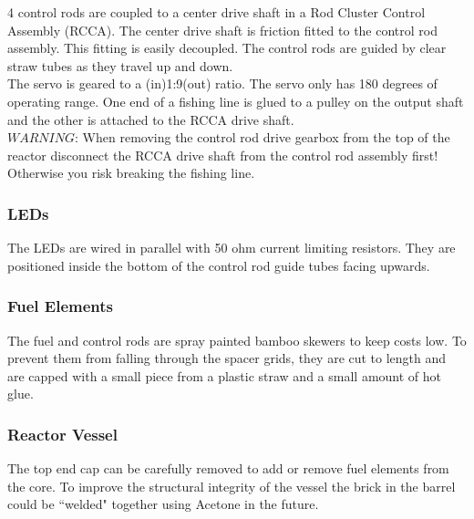 \documentclass[8pt]{article}
\begin{document}
4 control rods are coupled to a center drive shaft in a Rod Cluster Control Assembly (RCCA).  The center drive shaft is friction fitted to the control rod assembly.  This fitting is easily decoupled. The control rods are guided by clear straw tubes as they travel up and down. \\

The servo is geared to a (in)1:9(out) ratio.  The servo only has 180 degrees of operating range.  One end of a fishing line is glued to a pulley on the output shaft and the other is attached to the RCCA drive shaft. \\

$WARNING$:  When removing the control rod drive gearbox from the top of the reactor  disconnect the RCCA drive shaft from the control rod assembly first!  Otherwise you risk breaking the fishing line.

\subsubsection{LEDs}

The LEDs are wired in parallel with 50 ohm current limiting resistors.  They are positioned inside the bottom of the control rod guide tubes facing upwards.

\subsubsection{Fuel Elements}

The fuel and control rods are spray painted bamboo skewers to keep costs low.  To prevent them from falling through the spacer grids, they are cut to length and are capped with a small piece from a plastic straw and a small amount of hot glue.

\subsubsection{Reactor Vessel}

The top end cap can be carefully removed to add or remove fuel elements from the core.  To improve the structural integrity of the vessel the brick in the barrel could be ``welded" together using Acetone in the future.
\end{document}
